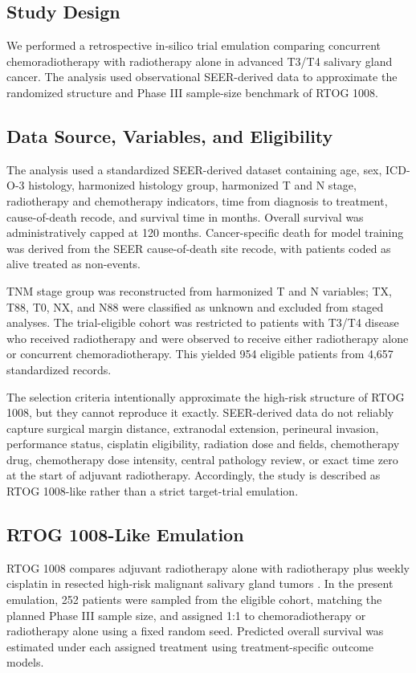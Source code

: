 \documentclass[10pt,twocolumn]{article}
\begin{document}
\subsection{Study Design}
We performed a retrospective in-silico trial emulation comparing concurrent chemoradiotherapy with radiotherapy alone in advanced T3/T4 salivary gland cancer. The analysis used observational SEER-derived data to approximate the randomized structure and Phase III sample-size benchmark of RTOG 1008.


\subsection{Data Source, Variables, and Eligibility}
The analysis used a standardized SEER-derived dataset containing age, sex, ICD-O-3 histology, harmonized histology group, harmonized T and N stage, radiotherapy and chemotherapy indicators, time from diagnosis to treatment, cause-of-death recode, and survival time in months. Overall survival was administratively capped at 120 months. Cancer-specific death for model training was derived from the SEER cause-of-death site recode, with patients coded as alive treated as non-events.


TNM stage group was reconstructed from harmonized T and N variables; TX, T88, T0, NX, and N88 were classified as unknown and excluded from staged analyses. The trial-eligible cohort was restricted to patients with T3/T4 disease who received radiotherapy and were observed to receive either radiotherapy alone or concurrent chemoradiotherapy. This yielded 954 eligible patients from 4,657 standardized records.


The selection criteria intentionally approximate the high-risk structure of RTOG 1008, but they cannot reproduce it exactly. SEER-derived data do not reliably capture surgical margin distance, extranodal extension, perineural invasion, performance status, cisplatin eligibility, radiation dose and fields, chemotherapy drug, chemotherapy dose intensity, central pathology review, or exact time zero at the start of adjuvant radiotherapy. Accordingly, the study is described as RTOG 1008-like rather than a strict target-trial emulation.


\subsection{RTOG 1008-Like Emulation}
RTOG 1008 compares adjuvant radiotherapy alone with radiotherapy plus weekly cisplatin in resected high-risk malignant salivary gland tumors \cite{ref22,ref23,ref24}. In the present emulation, 252 patients were sampled from the eligible cohort, matching the planned Phase III sample size, and assigned 1:1 to chemoradiotherapy or radiotherapy alone using a fixed random seed. Predicted overall survival was estimated under each assigned treatment using treatment-specific outcome models.
\end{document}
